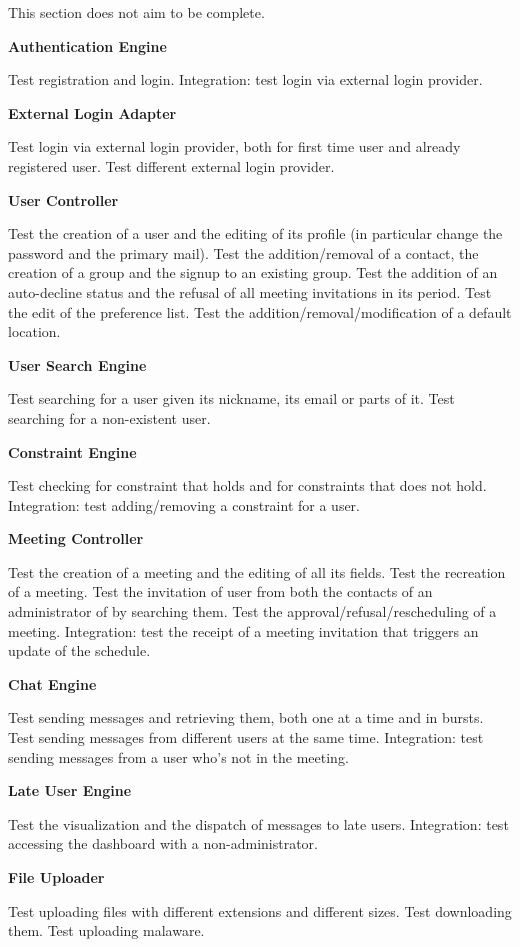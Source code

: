 This section does not aim to be complete.

\textbf{Authentication Engine}

Test registration and login.
Integration: test login via external login provider.

\textbf{External Login Adapter}

Test login via external login provider, both for first time user and already registered user.
Test different external login provider.

\textbf{User Controller}

Test the creation of a user and the editing of its profile (in particular change the password and the primary mail).
Test the addition/removal of a contact, the creation of a group and the signup to an existing group.
Test the addition of an auto-decline status and the refusal of all meeting invitations in its period.
Test the edit of the preference list.
Test the addition/removal/modification of a default location.

\textbf{User Search Engine}

Test searching for a user given its nickname, its email or parts of it.
Test searching for a non-existent user.

\textbf{Constraint Engine}

Test checking for constraint that holds and for constraints that does not hold.
Integration: test adding/removing a constraint for a user.

\textbf{Meeting Controller}

Test the creation of a meeting and the editing of all its fields.
Test the recreation of a meeting.
Test the invitation of user from both the contacts of an administrator of by searching them.
Test the approval/refusal/rescheduling of a meeting.
Integration: test the receipt of a meeting invitation that triggers an update of the schedule.

\textbf{Chat Engine}

Test sending messages and retrieving them, both one at a time and in bursts.
Test sending messages from different users at the same time.
Integration: test sending messages from a user who's not in the meeting.

\textbf{Late User Engine}

Test the visualization and the dispatch of messages to late users.
Integration: test accessing the dashboard with a non-administrator.

\textbf{File Uploader}

Test uploading files with different extensions and different sizes.
Test downloading them.
Test uploading malaware.

